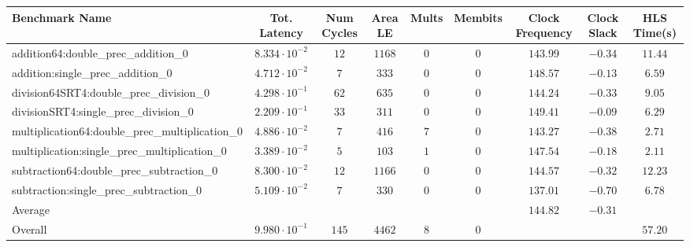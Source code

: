 \begin{tabular}{|l|c|c|c|c|c|c|c|c|}
\hline
Benchmark Name                                   & Tot. Latency            & Num Cycles & Area LE  & Mults & Membits & Clock Frequency & Clock Slack & HLS Time(s) \\
\hline
addition64:double\_prec\_addition\_0             & $ 8.334 \cdot 10^{-2} $ & $ 12     $ & $ 1168 $ & $ 0 $ & $ 0   $ & $ 143.99      $ & $ -0.34   $ & $ 11.44   $ \\
addition:single\_prec\_addition\_0               & $ 4.712 \cdot 10^{-2} $ & $ 7      $ & $ 333  $ & $ 0 $ & $ 0   $ & $ 148.57      $ & $ -0.13   $ & $ 6.59    $ \\
division64SRT4:double\_prec\_division\_0         & $ 4.298 \cdot 10^{-1} $ & $ 62     $ & $ 635  $ & $ 0 $ & $ 0   $ & $ 144.24      $ & $ -0.33   $ & $ 9.05    $ \\
divisionSRT4:single\_prec\_division\_0           & $ 2.209 \cdot 10^{-1} $ & $ 33     $ & $ 311  $ & $ 0 $ & $ 0   $ & $ 149.41      $ & $ -0.09   $ & $ 6.29    $ \\
multiplication64:double\_prec\_multiplication\_0 & $ 4.886 \cdot 10^{-2} $ & $ 7      $ & $ 416  $ & $ 7 $ & $ 0   $ & $ 143.27      $ & $ -0.38   $ & $ 2.71    $ \\
multiplication:single\_prec\_multiplication\_0   & $ 3.389 \cdot 10^{-2} $ & $ 5      $ & $ 103  $ & $ 1 $ & $ 0   $ & $ 147.54      $ & $ -0.18   $ & $ 2.11    $ \\
subtraction64:double\_prec\_subtraction\_0       & $ 8.300 \cdot 10^{-2} $ & $ 12     $ & $ 1166 $ & $ 0 $ & $ 0   $ & $ 144.57      $ & $ -0.32   $ & $ 12.23   $ \\
subtraction:single\_prec\_subtraction\_0         & $ 5.109 \cdot 10^{-2} $ & $ 7      $ & $ 330  $ & $ 0 $ & $ 0   $ & $ 137.01      $ & $ -0.70   $ & $ 6.78    $ \\
\hline
Average                                          & $                     $ & $        $ & $      $ & $   $ & $     $ & $ 144.82      $ & $ -0.31   $ & $         $ \\
\hline
Overall                                          & $ 9.980 \cdot 10^{-1} $ & $ 145    $ & $ 4462 $ & $ 8 $ & $ 0   $ & $             $ & $         $ & $ 57.20   $ \\
\hline
\end{tabular}
